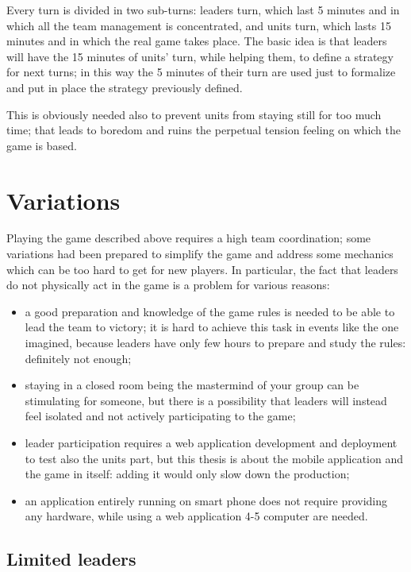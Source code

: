 			Every turn is divided in two sub-turns: leaders turn, which last 5 minutes and in which all the team management is concentrated, and units turn, which lasts 15 minutes and in which the real game takes place.
			The basic idea is that leaders will have the 15 minutes of units' turn, while helping them, to define a strategy for next turns; in this way the 5 minutes of their turn are used just to formalize and put in place the strategy previously defined.
			
			This is obviously needed also to prevent units from staying still for too much time; that leads to boredom and ruins the perpetual tension feeling on which the game is based.
			
	\section{Variations}
		
		Playing the game described above requires a high team coordination; some variations had been prepared to simplify the game and address some mechanics which can be too hard to get for new players.
		In particular, the fact that leaders do not physically act in the game is a problem for various reasons:
		
		\begin{itemize}
			\item a good preparation and knowledge of the game rules is needed to be able to lead the team to victory; it is hard to achieve this task in events like the one imagined, because leaders have only few hours to prepare and study the rules: definitely not enough;
			\item staying in a closed room being the mastermind of your group can be stimulating for someone, but there is a possibility that leaders will instead feel isolated and not actively participating to the game;
			\item leader participation requires a web application development and deployment to test also the units part, but this thesis is about the mobile application and the game in itself: adding it would only slow down the production;
			\item an application entirely running on smart phone does not require providing any hardware, while using a web application 4-5 computer are needed.
		\end{itemize}
		
		\newpage
		
		\subsection{Limited leaders}
		
